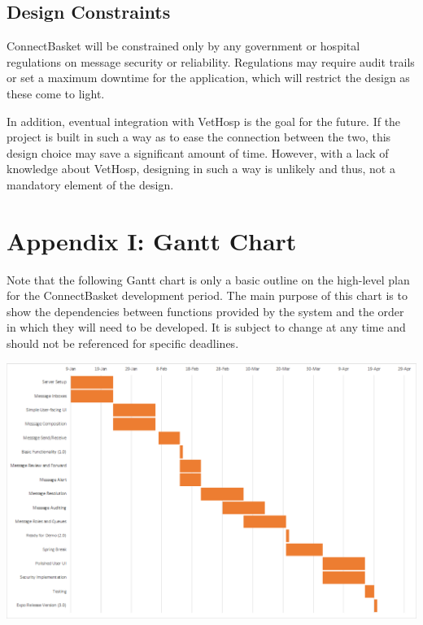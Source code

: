 \documentclass[onecolumn, draftclsnofoot,10pt, compsoc]{IEEEtran}
\begin{document}
\subsection{Design Constraints}
ConnectBasket will be constrained only by any government or hospital regulations on message security or reliability. Regulations may require audit trails or set a maximum downtime for the application, which will restrict the design as these come to light.

In addition, eventual integration with VetHosp is the goal for the future. If the project is built in such a way as to ease the connection between the two, this design choice may save a significant amount of time. However, with a lack of knowledge about VetHosp, designing in such a way is unlikely and thus, not a mandatory element of the design.
\newpage
\section{Appendix I: Gantt Chart}
Note that the following Gantt chart is only a basic outline on the high-level plan for the ConnectBasket development period. The main purpose of this chart is to show the dependencies between functions provided by the system and the order in which they will need to be developed. It is subject to change at any time and should not be referenced for specific deadlines.

\includegraphics[angle=-90,origin=c,width=\textwidth,height=\textheight,keepaspectratio]{gantt-chart.eps}
\end{document}
